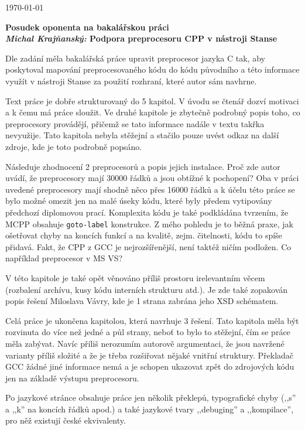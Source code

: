 \documentclass{article}
\begin{document}
\begin{flushright}
\today
\end{flushright}
\begin{center}
\Large\textbf{Posudek oponenta na bakalářskou práci \\
\normalsize%
\textit{Michal Krajňanský:} Podpora preprocesoru CPP v nástroji Stanse}
\end{center}

Dle zadání měla bakalářská práce upravit preprocesor jazyka C tak, aby poskytoval mapování preprocesovaného kódu do kódu původního a této informace využít v nástroji Stanse za použití rozhraní, které autor sám navhrne.

Text práce je dobře strukturovaný do 5 kapitol. V úvodu se čtenář dozví
motivaci a k čemu má práce sloužit. Ve druhé kapitole je zbytečně podrobný
popis toho, co preprocesory provádějí, přičemž se tato informace nadále v
textu takřka nevyužije. Tato kapitola nebyla stěžejní a stačilo pouze uvést
odkaz na další zdroje, kde je toto podrobně popsáno.

Následuje zhodnocení 2 preprocesorů a popis jejich instalace. Proč zde autor
uvádí, že preprocesory mají 30000 řádků a jsou obtížné k pochopení? Oba
v práci uvedené preprocesory mají shodně něco přes 16000 řádků a k účelu této
práce se bylo možné omezit jen na malé úseky kódu, které byly předem vytipovány
předchozí diplomovou prací. Komplexita kódu je také podkládána tvrzením, že
\textsc{MCPP} obsahuje \texttt{goto-label} konstrukce. Z mého pohledu je to
běžná praxe, jak ošetřovat chyby na koncích funkcí a na kvalitě, zejm.
čitelnosti, kódu to spíše přidavá.  Fakt, že \textsc{CPP} z \textsc{GCC} je
nejrozšířenější, není taktéž ničím podložen. Co například preprocesor v MS VS?

V této kapitole je také opět věnováno příliš prostoru irelevantním věcem
(rozbalení archívu, kusy kódu interních strukturu atd.). Je zde také zopakován
popis řešení Miloslava Vávry, kde je 1 strana zabrána jeho XSD schématem.

Celá práce je ukončena kapitolou, která navrhuje 3 řešení. Tato kapitola měla
být rozvinuta do více než jedné a půl strany, neboť to bylo to stěžejní, čím
se práce měla zabývat. Navíc příliš nerozumím autorově argumentaci, že jsou
navržené varianty příliš složité a že je třeba rozšiřovat nějaké vnitřní
struktury. Překladač \textsc{GCC} žádné jiné informace nemá a je schopen
ukazovat zpět do zdrojových kódu jen na základě výstupu preprocesoru.

Po jazykové stránce obsahuje práce jen několik překlepů, typografické chyby
(,,s'' a ,,k'' na koncích řádků apod.) a také jazykové tvary ,,debuging'' a
,,kompilace'', pro něž existují české ekvivalenty.
\end{document}
